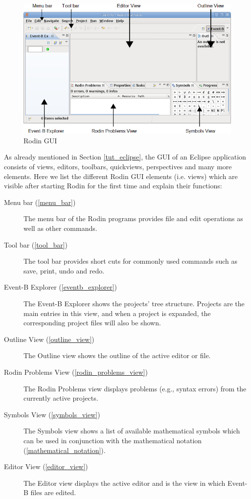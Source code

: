 \begin{figure}[!ht]
\begin{center}
	\includegraphics{img/tutorial/tut_02_install2.png}
	\caption{Rodin GUI}
	\label{fig_tut_02_rodin_gui}
\end{center}
\end{figure}

As already mentioned in Section \ref{tut_eclipse}, the GUI of an Eclipse application consists of views, editors, toolbars, quickviews, perspectives and many more elements. Here we list the different Rodin GUI elements (i.e. views) which are visible after starting Rodin for the first time and explain their functions:

\begin{description}
	\item[Menu bar (\ref{menu_bar})] The menu bar of the Rodin programs provides file and edit operations as well as other commands.
	\item[Tool bar (\ref{tool_bar})] The tool bar provides short cuts for commonly used commands such as save, print, undo and redo.
	\item[Event-B Explorer (\ref{eventb_explorer})] The Event-B Explorer shows the projects' tree structure. Projects are the main entries in this view, and when a project is expanded, the corresponding project files will also be shown.
	\item[Outline View (\ref{outline_view})] The Outline view shows the outline of the active editor or file.
	\item[Rodin Problems View (\ref{rodin_problems_view})] The Rodin Problems view displays problems (e.g., syntax errors) from the currently active projects.
	\item[Symbols View (\ref{symbols_view})] The Symbols view shows a list of available mathematical symbols which can be used in conjunction with the mathematical notation (\ref{mathematical_notation}).
	\item[Editor View (\ref{editor_view})] The Editor view displays the active editor and is the view in which Event-B files are edited.
\end{description}

